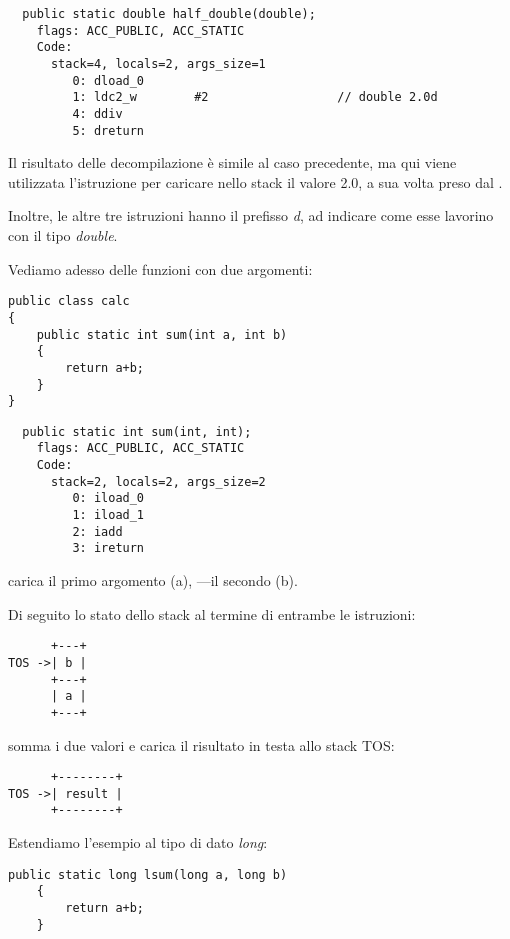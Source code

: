 \begin{lstlisting}
  public static double half_double(double);
    flags: ACC_PUBLIC, ACC_STATIC
    Code:
      stack=4, locals=2, args_size=1
         0: dload_0       
         1: ldc2_w        #2                  // double 2.0d
         4: ddiv          
         5: dreturn       
\end{lstlisting}

Il risultato delle decompilazione è simile al caso precedente, ma qui viene utilizzata l'istruzione  per caricare nello stack
il valore 2.0, a sua volta preso dal .

Inoltre, le altre tre istruzioni hanno il prefisso \emph{d}, 
ad indicare come esse lavorino con il tipo \emph{double}.


Vediamo adesso delle funzioni con due argomenti:


\begin{lstlisting}[style=customjava]
public class calc
{
	public static int sum(int a, int b)
	{
		return a+b;
	}
}
\end{lstlisting}

\begin{lstlisting}
  public static int sum(int, int);
    flags: ACC_PUBLIC, ACC_STATIC
    Code:
      stack=2, locals=2, args_size=2
         0: iload_0       
         1: iload_1       
         2: iadd          
         3: ireturn       
\end{lstlisting}

 carica il primo argomento (a), ---il secondo (b).

Di seguito lo stato dello stack al termine di entrambe le istruzioni:


\begin{lstlisting}
      +---+
TOS ->| b |
      +---+
      | a |
      +---+
\end{lstlisting}

 somma i due valori e carica il risultato in testa allo stack \ac{TOS}:


\begin{lstlisting}
      +--------+
TOS ->| result |
      +--------+
\end{lstlisting}

Estendiamo l'esempio al tipo di dato \emph{long}:


\begin{lstlisting}[style=customjava]
	public static long lsum(long a, long b)
	{
		return a+b;
	}
\end{lstlisting}

